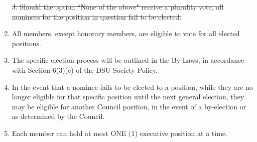 \documentclass[]{report}
\begin{document}
\begin{enumerate}
		\st{J. Should the option ``None of the above" receive a plurality vote, all nominees for the position in question fail to be elected.}\color{red}
		\item All members, except honorary members, are eligible to vote for all elected positions.
		\item The specific election process will be outlined in the By-Laws, in accordance with Section 6(3)(e) of the DSU Society Policy.\color{black}
		\item In the event that a nominee fails to be elected to a position, while they are no longer eligible for that specific position until the next general election, they may be eligible for another Council position, in the event of a by-election or as determined by the Council.
		\item Each member can hold at most ONE (1) executive position at a time.
	
	\end{enumerate}
\end{document}
